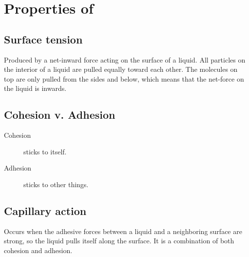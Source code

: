 \section{Properties of }
\subsection{Surface tension}
Produced by a net-inward force acting on the surface of a liquid. All particles
on the interior of a liquid are pulled equally toward each other. The molecules
on top are only pulled from the sides and below, which means that the net-force
on the liquid is inwards.

\subsection{Cohesion v. Adhesion}
\begin{description}
  \item[Cohesion]  sticks to itself.
  \item[Adhesion]  sticks to other things.
\end{description}

\subsection{Capillary action}
Occurs when the adhesive forces between a liquid and a neighboring surface are
strong, so the liquid pulls itself along the surface. It is a combination of
both cohesion and adhesion.
